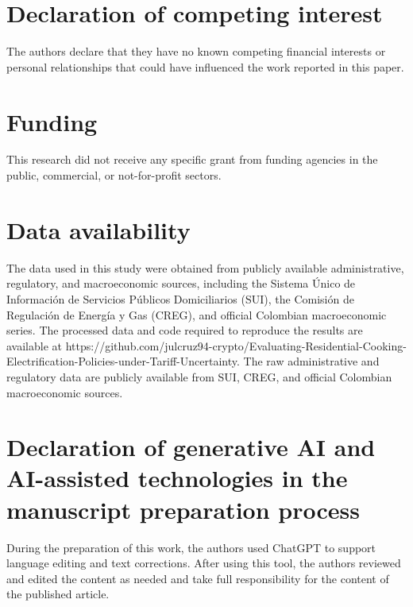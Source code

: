\documentclass[authoryear,preprint,review,10pt]{elsarticle}
\begin{document}
\section*{Declaration of competing interest}

The authors declare that they have no known competing financial interests or personal relationships that could have influenced the work reported in this paper.


\section*{Funding}

This research did not receive any specific grant from funding agencies in the public, commercial, or not-for-profit sectors.


\section*{Data availability}

The data used in this study were obtained from publicly available administrative, regulatory, and macroeconomic sources, including the Sistema Único de Información de Servicios Públicos Domiciliarios (SUI), the Comisión de Regulación de Energía y Gas (CREG), and official Colombian macroeconomic series. The processed data and code required to reproduce the results are available at https://github.com/julcruz94-crypto/Evaluating-Residential-Cooking-Electrification-Policies-under-Tariff-Uncertainty. The raw administrative and regulatory data are publicly available from SUI, CREG, and official Colombian macroeconomic sources.


\section*{Declaration of generative AI and AI-assisted technologies in the manuscript preparation process}

During the preparation of this work, the authors used ChatGPT to support language editing and text corrections. After using this tool, the authors reviewed and edited the content as needed and take full responsibility for the content of the published article.
\end{document}
